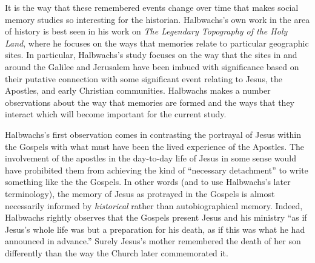 It is the way that these remembered events change over time that makes
social memory studies so interesting for the historian. Halbwachs's own
work in the area of history is best seen in his work on \emph{The
Legendary Topography of the Holy Land}, where he focuses on the ways
that memories relate to particular geographic sites. In particular,
Halbwachs's study focuses on the way that the sites in and around the
Galilee and Jerusalem have been imbued with significance based on their
putative connection with some significant event relating to Jesus, the
Apostles, and early Christian communities. Halbwachs makes a number
observations about the way that memories are formed and the ways that
they interact which will become important for the current study.

Halbwachs's first observation comes in contrasting the portrayal of
Jesus within the Gospels with what must have been the lived experience
of the Apostles.\autocite[193--198]{halbwachs1992} The involvement of
the apostles in the day-to-day life of Jesus in some sense would have
prohibited them from achieving the kind of ``necessary detachment'' to
write something like the the Gospels. In other words (and to use
Halbwachs's later terminology), the memory of Jesus as protrayed in the
Gospels is almost necessarily informed by \emph{historical} rather than
autobiographical memory.\autocite[194]{halbwachs1992} Indeed, Halbwachs
rightly observes that the Gospels present Jesus and his ministry ``as if
Jesus's whole life was but a preparation for his death, as if this was
what he had announced in advance.''\autocite[198]{halbwachs1992} Surely
Jesus's mother remembered the death of her son differently than the way
the Church later commemorated it.\autocites[It is worth noting that
Halbachs himself compares his basic sentiment toward the historicity of
the Gospels as similar to that of Ernst Renan. Of course, the field of
New Testament studies has progressed considerably in content, method,
and nuance beyond Renan, whatever the merits of his work may have been.
While Halbachs seems to take seriously that Jesus did exist, he does not
accept the Gospels at face value as historically accurate. That said,
throughout the work, Halbwachs does talk about the ``actual'' past and
allows for the possibility that the Gospels do refer, at least
partially, to these real events. Which is to say, he is not making the
argument that the Gospels were fabricated of whole-cloth, but that the
``actual past'' is irretrievable and unknowable and that historical
memory has no obligation to align with the actual past as such.
Regardless of whether Halbwachs's conception of Early Christianity would
be considered sound today, the idea that the Gospels represent several
collective remembrances of Jesus's life, ministry and death each bearing
marks from their own \emph{Sitz im Leben} (to borrow from the form
critics) seems relatively uncontroversial. A number of studies on the
Jesus and early Christian memory have come about in the past several
years. See][]{ledonne2009}{rodriguez2010}[For an overview of the modern
impact of Halbwachs (and memory studies more generally) on the field of
Historical Jesus studies, see][]{keith_ec2015}[and][]{keith_ec2015b}

